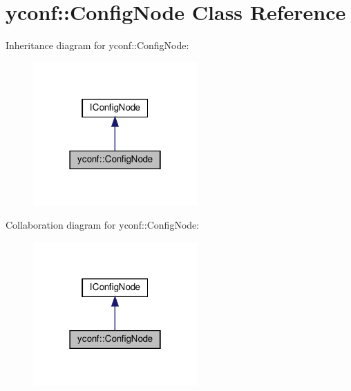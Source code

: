 \hypertarget{classyconf_1_1ConfigNode}{}\section{yconf\+:\+:Config\+Node Class Reference}
\label{classyconf_1_1ConfigNode}


Inheritance diagram for yconf\+:\+:Config\+Node\+:
\nopagebreak
\begin{figure}[H]
\begin{center}
\leavevmode
\includegraphics[width=178pt]{classyconf_1_1ConfigNode__inherit__graph}
\end{center}
\end{figure}


Collaboration diagram for yconf\+:\+:Config\+Node\+:
\nopagebreak
\begin{figure}[H]
\begin{center}
\leavevmode
\includegraphics[width=178pt]{classyconf_1_1ConfigNode__coll__graph}
\end{center}
\end{figure}
